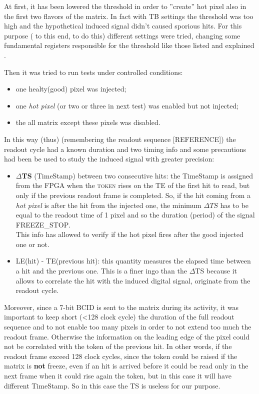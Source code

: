 At first, it has been lowered the threshold in order to ''create'' hot pixel also in the first two flavors of the matrix. In fact with TB settings the threshold was too high and the hypothetical induced signal didn't caused sporious hits. For this purpose ( to this end, to do this) different settings were tried, changing some fundamental registers responsible for the threshold like those listed and explained . 

Then it was tried to run tests under controlled conditions:
\begin{itemize}
\item one healty(good) pixel was injected;
\item one \textit{hot pixel} (or two or three in next test) was enabled but not injected;
\item the all matrix except these pixels was disabled.
\end{itemize}

In this way (thus) (remembering the readout sequence [REFERENCE]) the readout cycle had a known duration and two timing info and some precautions had been be used to study the induced signal with greater precision:

\begin{itemize}
\item \textbf{$\Delta$TS} (TimeStamp) between two consecutive hits: the TimeStamp is assigned from the FPGA when the \textsc{token} rises on the TE of the first hit to read, but only if the previous readout frame is completed. So, if the hit coming from a \textit{hot pixel} is after the hit from the injected one, the minimum $\Delta TS$ has to be equal to the readout time of 1 pixel and so the duration (period) of the signal \textsc{FREEZE\_STOP}.\\
This info has allowed to verify if the hot pixel fires after the good injected one or not.
\item LE(hit) - TE(previous hit): this quantity measures the elapsed time between a hit and the previous one. This is a finer ingo than the $\Delta$TS because it allows to correlate the hit with the induced digital signal, originate from the readout cycle.
\end{itemize}

Moreover, since a 7-bit BCID is sent to the matrix during its activity, it was important to keep short (<128 clock cycle) the duration of the full readout sequence and to not enable too many pixels in order to not extend too much the readout frame. Otherwise the information on the leading edge of the pixel could not be correlated with the token of the previous hit. In other words, if the readout frame exceed 128 clock cycles, since the token could be raised if the matrix is \textbf{not} freeze, even if an hit is arrived before it could be read only in the next frame when it could rise again the token, but in this case it will have different TimeStamp. So in this case the TS is useless for our purpose.


